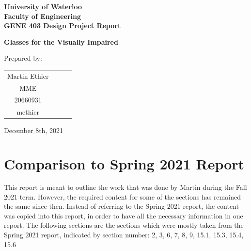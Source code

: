 \documentclass[a4paper,11pt]{article}
\begin{document}

\begin{titlingpage}
    \begin{center}
        {\huge\bfseries%
            University of Waterloo \\
        }
        \vspace{1em}
        {\Large\bfseries%
            Faculty of Engineering \\
            \vspace{1em}
            GENE 403 Design Project Report \\
        }
        
        \vspace{15em}
    
        {\Huge\bfseries%
            Glasses for the Visually Impaired \\[0.5em]
        }

        \vspace{15em}
        
        Prepared by: \\
        \vspace{1em}
        \begin{tabular}{cccc}
            Martin Ethier \\
            MME \\
            20660931 \\
            methier
        \end{tabular}
        
        \vspace{9em}
        
        December 8th, 2021
        
    \end{center}
\end{titlingpage}

\newpage

\tableofcontents

\newpage

\section{Comparison to Spring 2021 Report}

This report is meant to outline the work that was done by Martin during the Fall 2021 term. However, the required content for some of the sections has remained the same since then. Instead of referring to the Spring 2021 report, the content was copied into this report, in order to have all the necessary information in one report. The following sections are the sections which were mostly taken from the Spring 2021 report, indicated by section number: 2, 3, 6, 7, 8, 9, 15.1, 15.3, 15.4, 15.6
\end{document}
